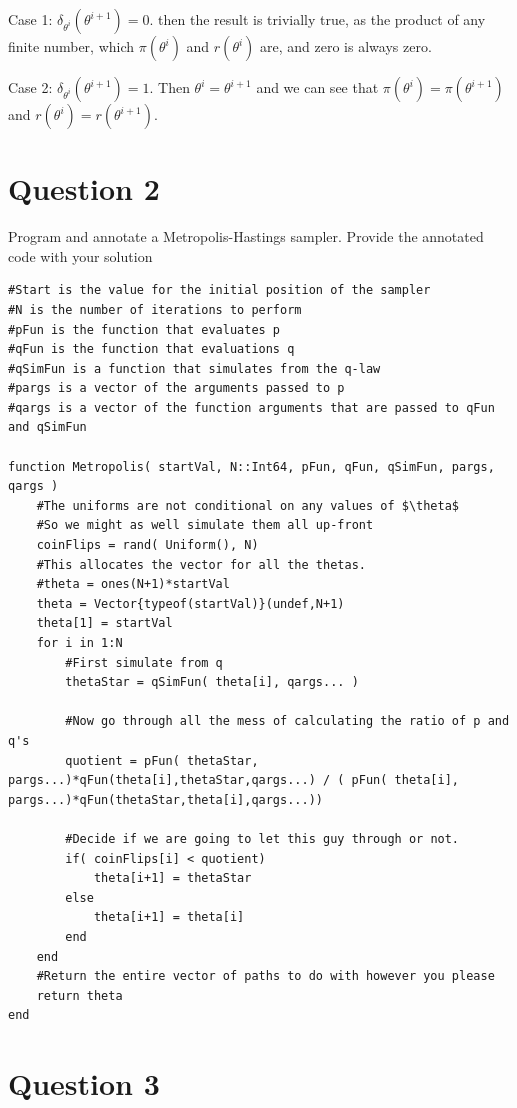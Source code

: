 \documentclass[12pt]{paper}
\begin{document}
Case 1: $\delta_{\theta^i}(\theta^{i+1}) = 0$. then the result is trivially true, as
the product of any finite number, which $\pi(\theta^i)$ and $r(\theta^{i})$ are,
and zero is always zero.

Case 2: $\delta_{\theta^i}(\theta^{i+1}) = 1$. Then $\theta^i = \theta^{i+1}$ and we can see
that $\pi(\theta^i) = \pi(\theta^{i+1})$ and $r(\theta^i) = r(\theta^{i+1})$.

\section{Question 2}
\label{sec:org80c94a5}
Program and annotate a Metropolis-Hastings sampler. Provide the
annotated code with your solution

\begin{verbatim}
#Start is the value for the initial position of the sampler
#N is the number of iterations to perform
#pFun is the function that evaluates p
#qFun is the function that evaluations q
#qSimFun is a function that simulates from the q-law
#pargs is a vector of the arguments passed to p
#qargs is a vector of the function arguments that are passed to qFun and qSimFun

function Metropolis( startVal, N::Int64, pFun, qFun, qSimFun, pargs, qargs )
    #The uniforms are not conditional on any values of $\theta$
    #So we might as well simulate them all up-front
    coinFlips = rand( Uniform(), N)
    #This allocates the vector for all the thetas.
    #theta = ones(N+1)*startVal
    theta = Vector{typeof(startVal)}(undef,N+1)
    theta[1] = startVal
    for i in 1:N
        #First simulate from q
        thetaStar = qSimFun( theta[i], qargs... )

        #Now go through all the mess of calculating the ratio of p and q's
        quotient = pFun( thetaStar, pargs...)*qFun(theta[i],thetaStar,qargs...) / ( pFun( theta[i], pargs...)*qFun(thetaStar,theta[i],qargs...))

        #Decide if we are going to let this guy through or not.
        if( coinFlips[i] < quotient)
            theta[i+1] = thetaStar
        else
            theta[i+1] = theta[i]
        end
    end
    #Return the entire vector of paths to do with however you please
    return theta
end
\end{verbatim}


\section{Question 3}
\label{sec:orga7ec8ff}
\end{document}
